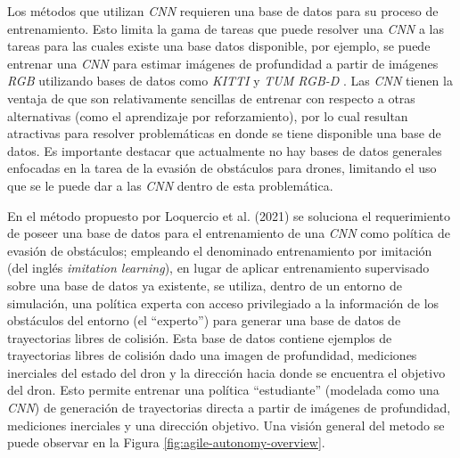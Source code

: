     \par Los métodos que utilizan \textit{CNN} requieren una base de datos para su proceso de entrenamiento. Esto limita la gama de tareas que puede resolver una \textit{CNN} a las tareas para las cuales existe una base datos disponible, por ejemplo, se puede entrenar una \textit{CNN} para estimar imágenes de profundidad a partir de imágenes \textit{RGB} utilizando bases de datos como \textit{KITTI} \cite{Geiger2013} y \textit{TUM RGB-D} \cite{Sturm2012}. Las \textit{CNN} tienen la ventaja de que son relativamente sencillas de entrenar con respecto a otras alternativas (como el aprendizaje por reforzamiento), por lo cual resultan atractivas para resolver problemáticas en donde se tiene disponible una base de datos. Es importante destacar que actualmente no hay bases de datos generales enfocadas en la tarea de la evasión de obstáculos para drones, limitando el uso que se le puede dar a las \textit{CNN} dentro de esta problemática. 
    
    \par En el método propuesto por Loquercio et al. (2021) \cite{Loquercio2021} se soluciona el requerimiento de poseer una base de datos para el entrenamiento de una \textit{CNN} como política de evasión de obstáculos; empleando el denominado entrenamiento por imitación (del inglés \textit{imitation learning}), en lugar de aplicar entrenamiento supervisado sobre una base de datos ya existente, se utiliza, dentro de un entorno de simulación, una política experta con acceso privilegiado a la información de los obstáculos del entorno (el ``experto'') para generar una base de datos de trayectorias libres de colisión. Esta base de datos contiene ejemplos de trayectorias libres de colisión dado una imagen de profundidad, mediciones inerciales del estado del dron y la dirección hacia donde se encuentra el objetivo del dron. Esto permite entrenar una política ``estudiante'' (modelada como una \textit{CNN}) de generación de trayectorias directa a partir de imágenes de profundidad, mediciones inerciales y una dirección objetivo. Una visión general del metodo se puede observar en la Figura \ref{fig:agile-autonomy-overview}.

